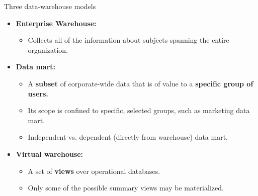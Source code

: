 \documentclass[aspectratio=169,t]{beamer}
\begin{document}
  { 
    \begin{frame}{Three data-warehouse models}
    \begin{itemize}
      \item \textbf{\color{airforceblue}Enterprise Warehouse:}
      \begin{itemize}
        \item Collects all of the information about subjects spanning the entire organization.
      \end{itemize}
      \item \textbf{\color{airforceblue}Data mart:}
      \begin{itemize}
        \item A \textbf{\color{airforceblue}subset} of corporate-wide data that is of value to a \textbf{\color{airforceblue}specific group of users.}
        \item Its scope is confined to specific, selected groups, such as marketing data mart.
        \item Independent vs. dependent (directly from warehouse) data mart.
      \end{itemize}
      \item \textbf{\color{airforceblue}Virtual warehouse:}
       \begin{itemize}
        \item A set of \textbf{\color{airforceblue}views} over operational databases.
        \item Only some of the possible summary views may be materialized.
      \end{itemize}
   \end{itemize}
    \end{frame}
  }
  
\end{document}
